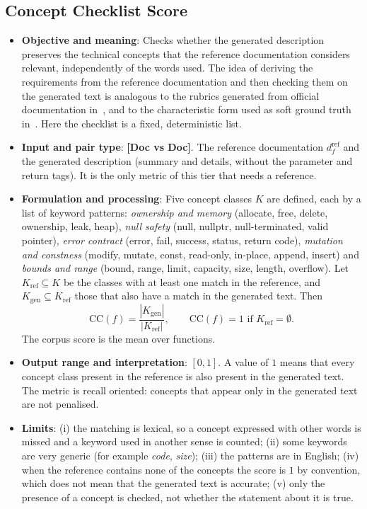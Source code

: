 \subsection{Concept Checklist Score}
\label{sec:m-checklist}
\begin{itemize}[leftmargin=*, label=\textbullet]
	\item \textbf{Objective and meaning}: Checks whether the generated description preserves the
	technical concepts that the reference documentation considers relevant, independently of the
	words used. The idea of deriving the requirements from the reference documentation and then
	checking them on the generated text is analogous to the rubrics generated from official
	documentation in~\cite{hoang_codewiki_2026}, and to the characteristic form used as soft ground
	truth in~\cite{patel_assetopsbench_2026}. Here the checklist is a fixed, deterministic list.

	\item \textbf{Input and pair type}: \textbf{[Doc vs Doc]}. The reference documentation
	$d_f^{\mathrm{ref}}$ and the generated description (summary and details, without the parameter and
	return tags). It is the only metric of this tier that needs a reference.

	\item \textbf{Formulation and processing}: Five concept classes $K$ are defined, each by a list of
	keyword patterns: \emph{ownership and memory} (allocate, free, delete, ownership, leak, heap),
	\emph{null safety} (null, nullptr, null-terminated, valid pointer), \emph{error contract} (error,
	fail, success, status, return code), \emph{mutation and constness} (modify, mutate, const,
	read-only, in-place, append, insert) and \emph{bounds and range} (bound, range, limit, capacity,
	size, length, overflow). Let $K_{\mathrm{ref}}\subseteq K$ be the classes with at least one match in
	the reference, and $K_{\mathrm{gen}}\subseteq K_{\mathrm{ref}}$ those that also have a match in the
	generated text. Then
	\begin{equation}
		\mathrm{CC}(f) = \frac{|K_{\mathrm{gen}}|}{|K_{\mathrm{ref}}|},
		\qquad \mathrm{CC}(f)=1 \text{ if } K_{\mathrm{ref}}=\emptyset .
		\label{eq:checklist}
	\end{equation}
	The corpus score is the mean over functions.

	\item \textbf{Output range and interpretation}: $[0,1]$. A value of $1$ means that every concept
	class present in the reference is also present in the generated text. The metric is recall
	oriented: concepts that appear only in the generated text are not penalised.

	\item \textbf{Limits}: (i) the matching is lexical, so a concept expressed with other words is
	missed and a keyword used in another sense is counted; (ii) some keywords are very generic (for
	example \emph{code}, \emph{size}); (iii) the patterns are in English; (iv) when the reference
	contains none of the concepts the score is $1$ by convention, which does not mean that the
	generated text is accurate; (v) only the presence of a concept is checked, not whether the
	statement about it is true.
\end{itemize}

